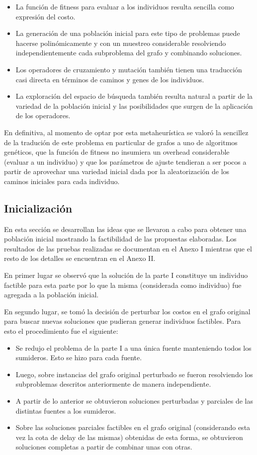 \documentclass{extarticle}
\newcommand{\squeezeup}{\vspace{-5.0mm}}
\begin{document}
\begin{itemize}
\begin{center}
	\end{center}
	\squeezeup
	\item La función de fitness para evaluar a los individuos resulta sencilla como expresión del costo.
	\item La generación de una población inicial para este tipo de problemas puede hacerse polinómicamente y con un muestreo considerable resolviendo independientemente cada subproblema del grafo y combinando soluciones.
	\item Los operadores de cruzamiento y mutación también tienen una traducción casi directa en términos de caminos y genes de los individuos.
	\item La exploración del espacio de búsqueda también resulta natural a partir de la variedad de la población inicial y las posibilidades que surgen de la aplicación de los operadores.
\end{itemize}

En definitiva, al momento de optar por esta metaheurística se valoró la sencillez de la tradución de este problema en particular de grafos a uno de algoritmos genéticos, que la función de fitness no insumiera un overhead considerable (evaluar a un individuo) y que los parámetros de ajuste tendieran a ser pocos a partir de aprovechar una variedad inicial dada por la aleatorización de los caminos iniciales para cada individuo.


\subsection{Inicialización}
En esta sección se desarrollan las ideas que se llevaron a cabo para obtener una población inicial mostrando la factibilidad de las propuestas elaboradas. Los resultados de las pruebas realizadas se documentan en el Anexo I mientras que el resto de los detalles se encuentran en el Anexo II.

En primer lugar se observó que la solución de la parte I constituye un individuo factible para esta parte por lo que la misma (considerada como individuo) fue agregada a la población inicial.

En segundo lugar, se tomó la decisión de perturbar los costos en el grafo original para buscar nuevas soluciones que pudieran generar individuos factibles. Para esto el procedimiento fue el siguiente:
\begin{itemize}
	\item Se redujo el problema de la parte I a una única fuente manteniendo todos los sumideros. Esto se hizo para cada fuente.
	\item Luego, sobre instancias del grafo original perturbado se fueron resolviendo los subproblemas descritos anteriormente de manera independiente.
	\item A partir de lo anterior se obtuvieron soluciones perturbadas y parciales de las distintas fuentes a los sumideros.
	\item Sobre las soluciones parciales factibles en el grafo original (considerando esta vez la cota de delay de las mismas) obtenidas de esta forma, se obtuvieron soluciones completas a partir de combinar unas con otras.
\end{itemize}
\end{document}
